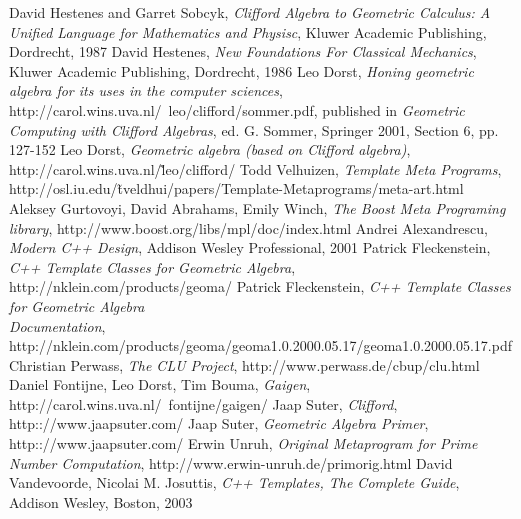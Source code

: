 \documentclass[10pt]{article}
\begin{document}
\begin{thebibliography}{99}


    David Hestenes and Garret Sobcyk, \emph{Clifford Algebra to Geometric
    Calculus: A Unified Language for Mathematics and Physisc}, Kluwer Academic
    Publishing, Dordrecht, 1987
    David Hestenes, \emph{New Foundations For Classical Mechanics},
    Kluwer Academic Publishing, Dordrecht, 1986
    Leo Dorst, \emph{Honing geometric algebra for its uses in the computer
    sciences}, http://carol.wins.uva.nl/~leo/clifford/sommer.pdf,
    published in \emph{Geometric Computing with Clifford Algebras}, ed. G. Sommer,
    Springer 2001, Section 6, pp. 127-152
    Leo Dorst, \emph{Geometric algebra (based on Clifford algebra)},
    \\http://carol.wins.uva.nl/\~leo/clifford/
    Todd Velhuizen, \emph{Template Meta Programs},
    \\http://osl.iu.edu/\~tveldhui/papers/Template-Metaprograms/meta-art.html
    Aleksey Gurtovoyi, David Abrahams, Emily Winch, \emph{The Boost Meta
    Programing library}, http://www.boost.org/libs/mpl/doc/index.html
    Andrei Alexandrescu, \emph{Modern C++ Design}, Addison Wesley Professional, 2001
    Patrick Fleckenstein, \emph{C++ Template Classes for Geometric Algebra}, \\
    http://nklein.com/products/geoma/
    Patrick Fleckenstein, \emph{C++ Template Classes for Geometric Algebra \\
    Documentation},
    \\http://nklein.com/products/geoma/geoma1.0.2000.05.17/geoma1.0.2000.05.17.pdf
    Christian Perwass, \emph{The CLU Project}, http://www.perwass.de/cbup/clu.html
    Daniel Fontijne, Leo Dorst, Tim Bouma, \emph{Gaigen}, \\
    http://carol.wins.uva.nl/~fontijne/gaigen/
    Jaap Suter, \emph{Clifford}, http:://www.jaapsuter.com/
    Jaap Suter, \emph{Geometric Algebra Primer}, http:://www.jaapsuter.com/
    Erwin Unruh, \emph{Original Metaprogram for Prime Number
    Computation}, http://www.erwin-unruh.de/primorig.html
    David Vandevoorde, Nicolai M. Josuttis, \emph{C++ Templates,
    The Complete Guide}, Addison Wesley, Boston, 2003

\end{thebibliography}
\end{document}
